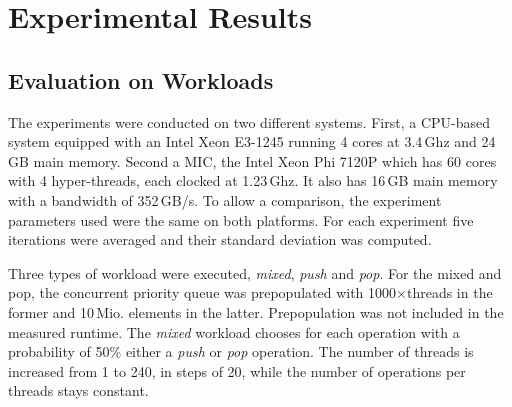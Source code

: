 \section{Experimental Results}
\label{sec:exp}
\subsection{Evaluation on Workloads}
The experiments were conducted on two different systems. First, a CPU-based system equipped with an Intel Xeon E3-1245 running 4 cores at 3.4\,Ghz and 24\,GB main memory. Second a MIC, the Intel Xeon Phi 7120P which has 60 cores with 4 hyper-threads, each clocked at 1.23\,Ghz. It also has 16\,GB main memory with a bandwidth of 352\,GB/s. To allow a comparison, the experiment parameters used were the same on both platforms. For each experiment five iterations were averaged and their standard deviation was computed.

Three types of workload were executed, \textit{mixed}, \textit{push} and \textit{pop}. For the mixed and pop, the concurrent priority queue was prepopulated with 1000$\times$threads in the former and 10\,Mio. elements in the latter. Prepopulation was not included in the measured runtime. The \textit{mixed} workload chooses for each operation with a probability of 50\% either a \textit{push} or \textit{pop} operation. The number of threads is increased from 1 to 240, in steps of 20, while the number of operations per threads stays constant.

